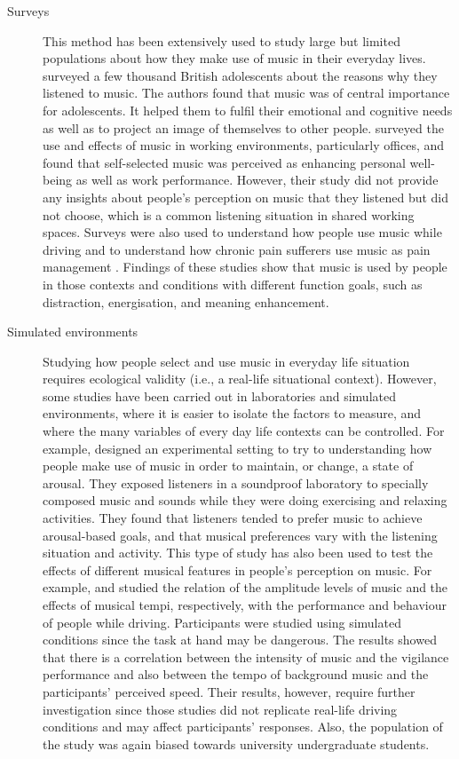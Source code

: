 \begin{description}
	\item[Surveys] This method has been extensively used to study large but limited populations about how they make use of music in their everyday lives. \textcite{north00importance} surveyed a few thousand British adolescents about the reasons why they listened to music. The authors found that music was of central importance for adolescents. It helped them to fulfil their emotional and cognitive needs as well as to project an image of themselves to other people. 
	\textcite{haake06music} surveyed the use and effects of music in working environments, particularly offices, and found that self-selected music was perceived as enhancing personal well-being as well as work performance. 
	However, their study did not provide any insights about people's perception on music that they listened but did not choose, which is a common listening situation in shared working spaces.
    Surveys were also used to understand how people use music while driving \autocite{dibben07exploratory} and to understand how chronic pain sufferers use music as pain management \autocite{mitchell07survey}. Findings of these studies show that music is used by people in those contexts and conditions with different function goals, such as distraction, energisation, and meaning enhancement.


	\item[Simulated environments] Studying how people select and use music in everyday life situation requires ecological validity (i.e., a real-life situational context). However, some studies have been carried out in laboratories and simulated environments, where it is easier to isolate the factors to measure, and where the many variables of every day life contexts can be controlled. 
	For example, \textcite{north00musical} designed an experimental setting to try to understanding how people make use of music in order to maintain, or change, a state of arousal. They exposed listeners in a soundproof laboratory to specially composed music and sounds while they were doing exercising and relaxing activities. They found that listeners tended to prefer music to achieve arousal-based goals, and that musical preferences vary with the listening situation and activity. 
	This type of study has also been used to test the effects of different musical features in people's perception on music. For example, \textcite{beh99performance} and \textcite{brodsky01effects} studied the relation of the amplitude levels of music and the effects of musical tempi, respectively, with the performance and behaviour of people while driving. Participants were studied using simulated conditions since the task at hand may be dangerous. The results showed that there is a correlation between the intensity of music and the vigilance performance and also between the tempo of background music and the participants' perceived speed. Their results, however, require further investigation since those studies did not replicate real-life driving conditions and may affect participants' responses. Also, the population of the study was again biased towards university undergraduate students.


\end{description}
